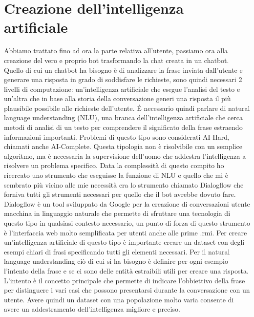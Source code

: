 \section{Creazione dell'intelligenza artificiale}

Abbiamo trattato fino ad ora la parte relativa all'utente, passiamo ora alla creazione del vero e proprio bot trasformando la chat creata in un chatbot. Quello di cui un chatbot ha bisogno è di analizzare la frase inviata dall'utente e generare una risposta in grado di soddisfare le richieste, sono quindi necessari 2 livelli di computazione: un'intelligenza artificiale che esegue l'analisi del testo e un'altra che in base alla storia della conversazione generi una risposta il più plausibile possibile alle richieste dell'utente.
\'E necessario quindi parlare di natural language understanding (NLU), una branca dell'intelligenza artificiale che cerca metodi di analisi di un testo per comprendere il significato della frase estraendo informazioni importanti. Problemi di questo tipo sono considerati AI-Hard, chiamati anche AI-Complete. Questa tipologia non è risolvibile con un semplice algoritmo, ma è necessaria la supervisione dell'uomo che addestra l'intelligenza a risolvere un problema specifico.
Data la complessità di questo compito ho ricercato uno strumento che eseguisse la funzione di NLU e quello che mi è sembrato più vicino alle mie necessità era lo strumento chiamato Dialogflow che forniva tutti gli strumenti necessari per quello che il bot avrebbe dovuto fare.
Dialogflow è un tool sviluppato da Google per la creazione di conversazioni utente macchina in linguaggio naturale che permette di sfruttare una tecnologia di questo tipo in qualsiasi contesto necessario, un punto di forza di questo strumento è l'interfaccia web molto semplificata per utenti anche alle prime .rmi.
Per creare un'intelligenza artificiale di questo tipo è importante creare un dataset con degli esempi chiari di frasi specificando tutti gli elementi necessari. Per il natural language understanding ciò di cui si ha bisogno è definire per ogni esempio l'intento della frase e se ci sono delle entità estraibili utili per creare una risposta.
L'intento è il concetto principale che permette di indicare l'obbiettivo della frase per distinguere i vari casi che possono presentarsi durante la conversazione con un utente. Avere quindi un dataset con una popolazione molto varia consente di avere un addestramento dell'intelligenza migliore e preciso.

